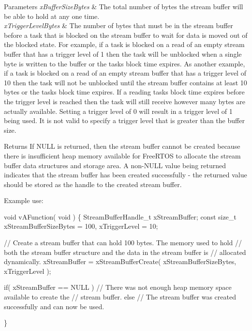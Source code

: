 \begin{DoxyParams}{Parameters}
{\em x\+Buffer\+Size\+Bytes} & The total number of bytes the stream buffer will be able to hold at any one time.\\
\hline
{\em x\+Trigger\+Level\+Bytes} & The number of bytes that must be in the stream buffer before a task that is blocked on the stream buffer to wait for data is moved out of the blocked state. For example, if a task is blocked on a read of an empty stream buffer that has a trigger level of 1 then the task will be unblocked when a single byte is written to the buffer or the task\textquotesingle{}s block time expires. As another example, if a task is blocked on a read of an empty stream buffer that has a trigger level of 10 then the task will not be unblocked until the stream buffer contains at least 10 bytes or the task\textquotesingle{}s block time expires. If a reading task\textquotesingle{}s block time expires before the trigger level is reached then the task will still receive however many bytes are actually available. Setting a trigger level of 0 will result in a trigger level of 1 being used. It is not valid to specify a trigger level that is greater than the buffer size.\\
\hline
\end{DoxyParams}
\begin{DoxyReturn}{Returns}
If N\+U\+LL is returned, then the stream buffer cannot be created because there is insufficient heap memory available for Free\+R\+T\+OS to allocate the stream buffer data structures and storage area. A non-\/\+N\+U\+LL value being returned indicates that the stream buffer has been created successfully -\/ the returned value should be stored as the handle to the created stream buffer.
\end{DoxyReturn}
Example use\+: 
\begin{DoxyPre}\end{DoxyPre}



\begin{DoxyPre}void vAFunction( void )
\{
StreamBufferHandle\_t xStreamBuffer;
const size\_t xStreamBufferSizeBytes = 100, xTriggerLevel = 10;
\begin{DoxyVerb}// Create a stream buffer that can hold 100 bytes.  The memory used to hold
// both the stream buffer structure and the data in the stream buffer is
// allocated dynamically.
xStreamBuffer = xStreamBufferCreate( xStreamBufferSizeBytes, xTriggerLevel );

if( xStreamBuffer == NULL )
{
    // There was not enough heap memory space available to create the
    // stream buffer.
}
else
{
    // The stream buffer was created successfully and can now be used.
}
\end{DoxyVerb}

\}
\end{DoxyPre}
 